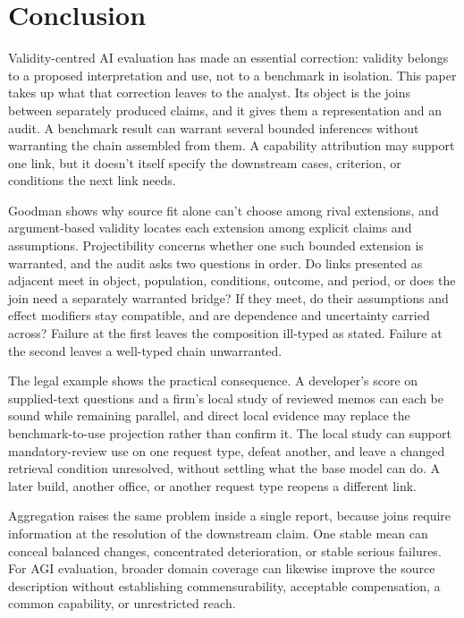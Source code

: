 \documentclass[12pt]{article}
\begin{document}
\section{Conclusion}\label{sec:conclusion}

Validity-centred AI evaluation has made an essential correction: validity belongs to a proposed interpretation and use, not to a benchmark in isolation. This paper takes up what that correction leaves to the analyst. Its object is the joins between separately produced claims, and it gives them a representation and an audit. A benchmark result can warrant several bounded inferences without warranting the chain assembled from them. A capability attribution may support one link, but it doesn't itself specify the downstream cases, criterion, or conditions the next link needs.

Goodman shows why source fit alone can't choose among rival extensions, and argument-based validity locates each extension among explicit claims and assumptions. Projectibility concerns whether one such bounded extension is warranted, and the audit asks two questions in order. Do links presented as adjacent meet in object, population, conditions, outcome, and period, or does the join need a separately warranted bridge? If they meet, do their assumptions and effect modifiers stay compatible, and are dependence and uncertainty carried across? Failure at the first leaves the composition ill-typed as stated. Failure at the second leaves a well-typed chain unwarranted.

The legal example shows the practical consequence. A developer's score on supplied-text questions and a firm's local study of reviewed memos can each be sound while remaining parallel, and direct local evidence may replace the benchmark-to-use projection rather than confirm it. The local study can support mandatory-review use on one request type, defeat another, and leave a changed retrieval condition unresolved, without settling what the base model can do. A later build, another office, or another request type reopens a different link.

Aggregation raises the same problem inside a single report, because joins require information at the resolution of the downstream claim. One stable mean can conceal balanced changes, concentrated deterioration, or stable serious failures. For AGI evaluation, broader domain coverage can likewise improve the source description without establishing commensurability, acceptable compensation, a common capability, or unrestricted reach.
\end{document}

